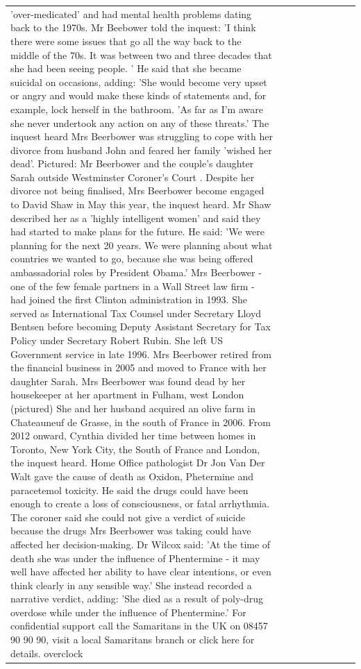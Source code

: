 \begin{table}[H]
\begin{tabular}{lllrlllll}
'over-medicated' and had mental health problems dating back to the 1970s. Mr Beebower told the inquest: 'I think there were some issues that go all the way back to the middle of the 70s. It was between two and three decades that she had been seeing people. ' He said that she became suicidal on occasions, adding: 'She would become very upset or angry and would make these kinds of statements and, for example, lock herself in the bathroom. 'As far as I'm aware she never undertook any action on any of these threats.' The inquest heard Mrs Beerbower was struggling to cope with her divorce from husband John and feared her family 'wished her dead'. Pictured: Mr Beerbower and the couple's daughter Sarah outside Westminster Coroner's Court . Despite her divorce not being finalised, Mrs Beerbower become engaged to David Shaw in May this year, the inquest heard. Mr Shaw described her as a 'highly intelligent women' and said they had started to make plans for the future. He said: 'We were planning for the next 20 years. We were planning about what countries we wanted to go, because she was being offered ambassadorial roles by President Obama.' Mrs Beerbower - one of the few female partners in a Wall Street law firm - had joined the first Clinton administration in 1993. She served as International Tax Counsel under Secretary Lloyd Bentsen before becoming Deputy Assistant Secretary for Tax Policy under Secretary Robert Rubin. She left US Government service in late 1996. Mrs Beerbower retired from the financial business in 2005 and moved to France with her daughter Sarah. Mrs Beerbower was found dead by her housekeeper at her apartment in Fulham, west London (pictured) She and her husband acquired an olive farm in Chateauneuf de Grasse, in the south of France in 2006. From 2012 onward, Cynthia divided her time between homes in Toronto, New York City, the South of France and London, the inquest heard. Home Office pathologist Dr Jon Van Der Walt gave the cause of death as Oxidon, Phetermine and paracetemol toxicity. He said the drugs could have been enough to create a loss of consciousness, or fatal arrhythmia. The coroner said she could not give a verdict of suicide because the drugs Mrs Beerbower was taking could have affected her decision-making. Dr Wilcox said: 'At the time of death she was under the influence of Phentermine - it may well have affected her ability to have clear intentions, or even think clearly in any sensible way.' She instead recorded a narrative verdict, adding: 'She died as a result of poly-drug overdose while under the influence of Phentermine.' For confidential support call the Samaritans in the UK on 08457 90 90 90, visit a local Samaritans branch or click here for details. overclock \\

\end{tabular}
\end{table}
